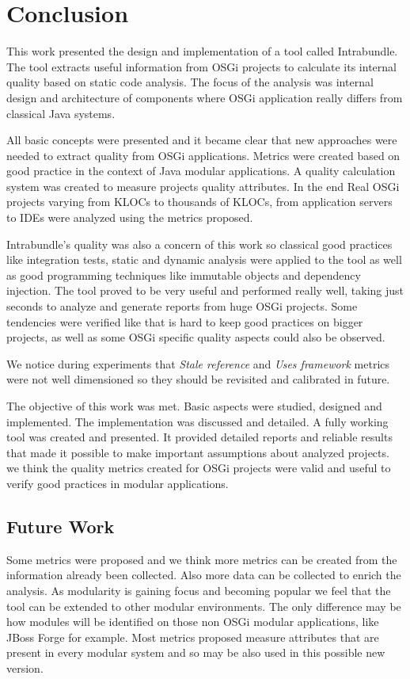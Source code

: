 \chapter{Conclusion}
This work presented the design and implementation of a tool called Intrabundle. The tool extracts useful information from OSGi projects to calculate its internal quality based on static code analysis. The focus of the analysis was internal design and architecture of components where OSGi application really differs from classical Java systems. 

All basic concepts were presented and it became clear that new approaches were needed to extract quality from OSGi applications. Metrics were created based on good practice in the context of Java modular applications. A quality calculation system was created to measure projects quality attributes. In the end Real OSGi projects varying from KLOCs to thousands of KLOCs, from application servers to IDEs were analyzed using the metrics proposed.

Intrabundle's quality was also a concern of this work so classical good practices like integration tests, static and dynamic analysis were applied to the tool as well as good programming techniques like immutable objects and dependency injection.      
The tool proved to be very useful and performed really well, taking just seconds to analyze and generate reports from huge OSGi projects. Some tendencies were verified like that is hard to keep good practices on bigger projects, as well as some OSGi specific quality aspects could also be observed. 

We notice during experiments that \emph{Stale reference} and \emph{Uses framework} metrics were not well dimensioned so they should be revisited and calibrated in future.

The objective of this work was met. Basic aspects were studied, designed and implemented. The implementation was discussed and detailed. A fully working tool was created and presented. It provided detailed reports and reliable results that made it possible to make important assumptions about analyzed projects. we think the quality metrics created for OSGi projects were valid and useful to verify good practices in modular applications. 

\section{Future Work}
Some metrics were proposed and we think more metrics can be created from the information already been collected. Also more data can be collected to enrich the analysis. 
As modularity is gaining focus and becoming popular we feel that the tool can be extended to other modular environments. The only difference may be how modules will be identified on those non OSGi modular applications, like JBoss Forge for example. Most metrics proposed measure attributes that are present in every modular system and so may be also used in this possible new version. 


